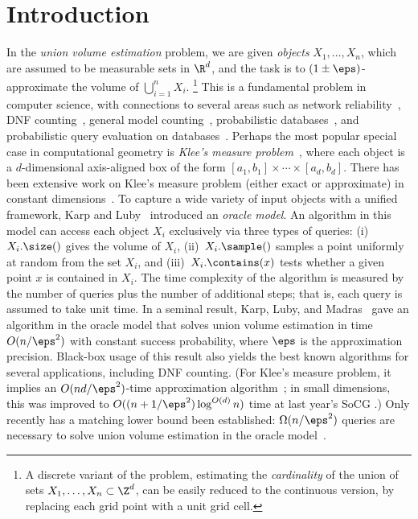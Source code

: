 \section{Introduction}
In the \emph{union volume estimation} problem, we are given \emph{objects} $X_1,\ldots,X_n$, which are assumed to be measurable sets in $\R^d$, and the task is to $(1\pm\eps)$-approximate the volume of $\bigcup_{i=1}^n X_i$.%
\footnote{A discrete variant of the problem, estimating the \emph{cardinality} of the union of sets $X_1,\ldots,X_n \subset \Z^d$, can be easily reduced to the continuous version, by replacing each grid point with a unit grid cell.}
This is a fundamental problem in computer science, with connections to several areas such as network reliability~\cite{Karger01, KarpLM89}, DNF counting~\cite{KarpLM89}, general model counting~\cite{pavan2023model, chakraborty2013scalable}, probabilistic databases~\cite{kimelfeld2008query, DalviS07, re2006efficient}, and probabilistic query evaluation on databases~\cite{carmeli2020answering, carmeli2023tractable}.
Perhaps the most popular special case in computational geometry is 
\emph{Klee's measure problem}~\cite{Klee77}, where each object is a $d$-dimensional axis-aligned box of the form $[a_1, b_1] \times \cdots \times [a_d, b_d]$. There has been extensive work on Klee's measure problem (either exact or approximate) in constant dimensions~\cite{OY91,Chan10,Chan13,Kunnemann22,GorbachevK23,BLNRW25}.
%
To capture a wide variety of input objects with a unified framework, Karp and Luby~\cite{KarpL85} introduced an \emph{oracle model}. An algorithm in this model can access each object $X_i$ exclusively via three types of queries: (i)~$X_i.\size()$ gives the volume of $X_i$, (ii)~$X_i.\sample()$ samples a point uniformly at random from the set $X_i$, and (iii)~$X_i.\contains(x)$ tests whether a given point $x$ is contained in $X_i$. The time complexity of the algorithm is measured by the number of queries plus the number of additional steps; that is, each query is assumed to take unit time. In a seminal result, Karp, Luby, and Madras~\cite{KarpLM89} gave an algorithm in the oracle model that solves union volume estimation in time $O(n/\eps^2)$ with constant success probability, where $\eps$ is the approximation precision. Black-box usage of this result also yields the best known algorithms for several applications, including DNF counting. (For Klee's measure problem, it implies an $O(nd / \eps^2)$-time approximation algorithm~\cite{BringmannF10}; in small dimensions, this was improved to $O((n+ 1/\eps^2)\log^{O(d)}n)$ time at last year's SoCG \cite{BLNRW25}.) Only recently has a matching lower bound been established: $\Omega(n/\eps^2)$ queries are necessary to solve union volume estimation in the oracle model~\cite{BLNRW25}.
